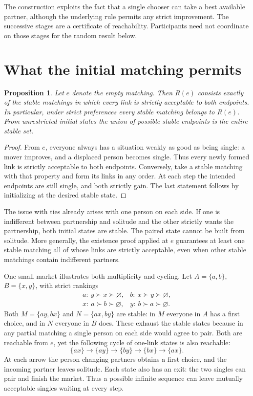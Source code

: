 \documentclass[11pt]{article}
\newtheorem{proposition}{Proposition}
\newcommand{\sg}{\varnothing}
\begin{document}
The construction exploits the fact that a single chooser can take a best available partner, although the underlying rule permits any strict improvement. The successive stages are a certificate of reachability. Participants need not coordinate on those stages for the random result below.

\section{What the initial matching permits}

\begin{proposition}
Let \(e\) denote the empty matching. Then \(R(e)\) consists exactly of the stable matchings in which every link is strictly acceptable to both endpoints. In particular, under strict preferences every stable matching belongs to \(R(e)\). From unrestricted initial states the union of possible stable endpoints is the entire stable set.
\end{proposition}

\begin{proof}
From \(e\), everyone always has a situation weakly as good as being single: a mover improves, and a displaced person becomes single. Thus every newly formed link is strictly acceptable to both endpoints. Conversely, take a stable matching with that property and form its links in any order. At each step the intended endpoints are still single, and both strictly gain. The last statement follows by initializing at the desired stable state.
\end{proof}

The issue with ties already arises with one person on each side. If one is indifferent between partnership and solitude and the other strictly wants the partnership, both initial states are stable. The paired state cannot be built from solitude. More generally, the existence proof applied at \(e\) guarantees at least one stable matching all of whose links are strictly acceptable, even when other stable matchings contain indifferent partners.

One small market illustrates both multiplicity and cycling. Let \(A=\{a,b\}\), \(B=\{x,y\}\), with strict rankings
\[
\begin{array}{ll}
 a:\ y\succ x\succ\sg, & b:\ x\succ y\succ\sg,\\
 x:\ a\succ b\succ\sg, & y:\ b\succ a\succ\sg .
\end{array}
\]
Both \(M=\{ay,bx\}\) and \(N=\{ax,by\}\) are stable: in \(M\) everyone in \(A\) has a first choice, and in \(N\) everyone in \(B\) does. These exhaust the stable states because in any partial matching a single person on each side would agree to pair. Both are reachable from \(e\), yet the following cycle of one-link states is also reachable:
\[
 \{ax\}\longrightarrow\{ay\}\longrightarrow\{by\}
 \longrightarrow\{bx\}\longrightarrow\{ax\}.
\]
At each arrow the person changing partners obtains a first choice, and the incoming partner leaves solitude. Each state also has an exit: the two singles can pair and finish the market. Thus a possible infinite sequence can leave mutually acceptable singles waiting at every step.
\end{document}

